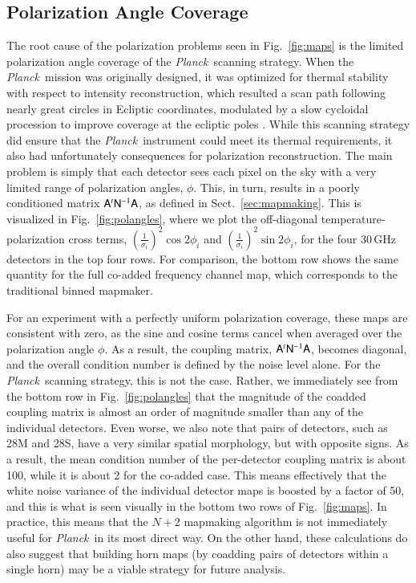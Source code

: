 \documentclass{aa}
\newcommand{\A}[0]{\tens{A}}
\newcommand{\N}[0]{\tens{N}}
\def\Planck{\textit{Planck}}
\begin{document}
\subsection{Polarization Angle Coverage}

The root cause of the polarization problems seen in Fig.~\ref{fig:maps} is the limited polarization angle coverage of the \Planck\ scanning strategy. When the \Planck\ mission was originally designed, it was optimized for thermal stability with respect to intensity reconstruction, which resulted a scan path following nearly great circles in Ecliptic coordinates, modulated by a slow cycloidal procession to improve coverage at the ecliptic poles \citep{planckScan}. While this scanning strategy did ensure that the \Planck\ instrument could meet its thermal requirements, it also had unfortunately consequences for polarization reconstruction. The main problem is simply that each detector sees each pixel on the sky with a very limited range of polarization angles, $\phi$. This, in turn, results in a poorly conditioned matrix $\A^t\N^{-1}\A$, as defined in Sect.~\ref{sec:mapmaking}. This is visualized in Fig.~\ref{fig:polangles}, where we plot the off-diagonal temperature-polarization cross terms, $(\frac{1}{\sigma_i})^2 \cos2\phi_i$ and $(\frac{1}{\sigma_i})^2 \sin2\phi_i$, for the four 30\,GHz detectors in the top four rows. For comparison, the bottom row shows the same quantity for the full co-added frequency channel map, which corresponds to the traditional binned mapmaker. 

For an experiment with a perfectly uniform polarization coverage, these maps are consistent with zero, as the sine and cosine terms cancel when averaged over the polarization angle $\phi$. As a result, the coupling matrix, $\A^t\N^{-1}\A$, becomes diagonal, and the overall condition number is defined by the noise level alone. For the \Planck\ scanning strategy, this is not the case. Rather, we immediately see from the bottom row in Fig.~\ref{fig:polangles} that the magnitude of the coadded coupling matrix is almost an order of magnitude smaller than any of the individual detectors. Even worse, we also note that pairs of detectors, such as 28M and 28S, have a very similar spatial morphology, but with opposite signs. As a result, the mean condition number of the per-detector coupling matrix is about 100, while it is about 2 for the co-added case. This means effectively that the white noise variance of the individual detector maps is boosted by a factor of 50, and this is what is seen visually in the bottom two rows of Fig.~\ref{fig:maps}. In practice, this means that the $N+2$ mapmaking algorithm is not immediately useful for \Planck\ in its most direct way. On the other hand, these calculations do also suggest that building horn maps (by coadding pairs of detectors within a single horn) may be a viable strategy for future analysis.
\end{document}
